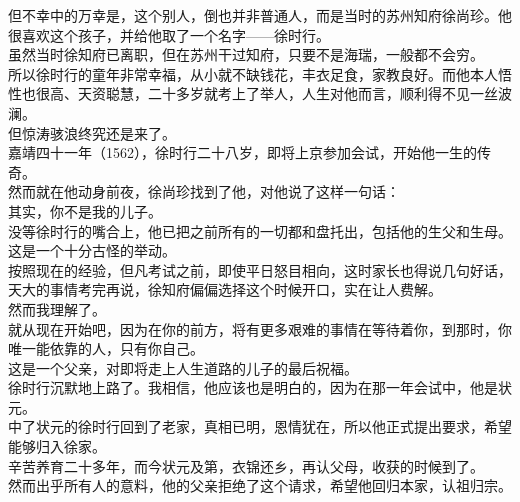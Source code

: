 \begin{multicols}{\theparacolNo}
但不幸中的万幸是，这个别人，倒也并非普通人，而是当时的苏州知府徐尚珍。他很喜欢这个孩子，并给他取了一个名字——徐时行。\\

虽然当时徐知府已离职，但在苏州干过知府，只要不是海瑞，一般都不会穷。\\

所以徐时行的童年非常幸福，从小就不缺钱花，丰衣足食，家教良好。而他本人悟性也很高、天资聪慧，二十多岁就考上了举人，人生对他而言，顺利得不见一丝波澜。\\

但惊涛骇浪终究还是来了。\\

嘉靖四十一年（1562），徐时行二十八岁，即将上京参加会试，开始他一生的传奇。\\

然而就在他动身前夜，徐尚珍找到了他，对他说了这样一句话：\\

其实，你不是我的儿子。\\

没等徐时行的嘴合上，他已把之前所有的一切都和盘托出，包括他的生父和生母。\\

这是一个十分古怪的举动。\\

按照现在的经验，但凡考试之前，即使平日怒目相向，这时家长也得说几句好话，天大的事情考完再说，徐知府偏偏选择这个时候开口，实在让人费解。\\

然而我理解了。\\

就从现在开始吧，因为在你的前方，将有更多艰难的事情在等待着你，到那时，你唯一能依靠的人，只有你自己。\\

这是一个父亲，对即将走上人生道路的儿子的最后祝福。\\

徐时行沉默地上路了。我相信，他应该也是明白的，因为在那一年会试中，他是状元。\\

中了状元的徐时行回到了老家，真相已明，恩情犹在，所以他正式提出要求，希望能够归入徐家。\\

辛苦养育二十多年，而今状元及第，衣锦还乡，再认父母，收获的时候到了。\\

然而出乎所有人的意料，他的父亲拒绝了这个请求，希望他回归本家，认祖归宗。\\


\end{multicols}

